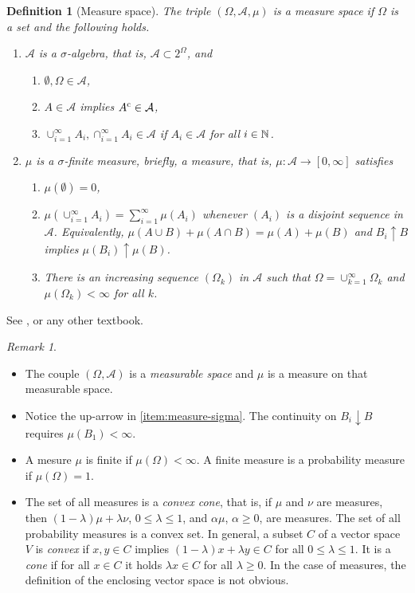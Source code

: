 \documentclass[12pt,a4paper]{amsart}
\theoremstyle{plain}
\newtheorem{definition}[theorem]{Definition}%
\theoremstyle{definition}
\theoremstyle{remark}
\newtheorem{remark}[theorem]{Remark}
\begin{document}
\begin{definition}[Measure space]
The triple $(\Omega,\mathcal A,\mu)$ is a \emph{measure space} if
$\Omega$ is a set and the following holds.
\begin{enumerate}
\item $\mathcal A$ is a \emph{$\sigma$-algebra}, that is, $\mathcal A
  \subset 2^\Omega$, and
  \begin{enumerate}
  \item $\emptyset, \Omega \in \mathcal A$,
  \item $A \in \mathcal A$ implies $A^{\text c} \in \mathcal A$,
  \item
    $\cup_{i=1}^{\infty} A_i, \cap_{i=1}^{\infty} A_i \in \mathcal A$
    if $A_i \in \mathcal A$ for all $i \in \mathbb{N}$.
  \end{enumerate}
  \item $\mu$ is a \emph{$\sigma$-finite measure}, briefly, a
    \emph{measure}, that is, $\mu \colon \mathcal A \to [0,\infty]$ satisfies
  \begin{enumerate} 
  \item $\mu(\emptyset) = 0$,
  \item \label{item:measure-sigma}
    $\mu\left(\cup_{i=1 }^\infty A_i\right) = \sum_{i=1}^\infty
    \mu(A_i)$ whenever $(A_i)$ is a disjoint sequence in $\mathcal
    A$. Equivalently,
    $\mu(A \cup B) + \mu(A \cap B) = \mu(A) + \mu(B)$ and
    $B_i \uparrow B$ implies $\mu(B_i) \uparrow \mu(B)$.
  \item There is an increasing sequence $(\Omega_k)$ in $\mathcal A$
    such that $\Omega = \cup_{k=1}^\infty \Omega_k$ and
    $\mu(\Omega_k) < \infty$ for all $k$.
  \end{enumerate}
\end{enumerate}
\end{definition}
See \cite[Cap. 1]{rudin:1987-3rd}, or any other textbook.
\begin{remark}\ 
\begin{itemize}
\item The couple $(\Omega,\mathcal A)$ is a \emph{measurable space} and
$\mu$ is a measure on that measurable space. 
\item  Notice the up-arrow in
\cref{item:measure-sigma}. The continuity on $B_i \downarrow B$
requires $\mu(B_1) < \infty$. 
\item  A mesure $\mu$ is finite if
$\mu(\Omega) < \infty$. A finite measure is a probability measure if
$\mu(\Omega) =1$.
\item The set of all measures is a \emph{convex cone}, that is, if
  $\mu$ and $\nu$ are measures, then $(1-\lambda)\mu+\lambda \nu$,
  $0 \leq \lambda \leq 1$, and $\alpha \mu$, $\alpha \geq 0$, are
  measures. The set of all probability measures is a convex set. In
  general, a subset $C$ of a vector space $V$ is \emph{convex} if
  $x,y \in C$ implies $(1-\lambda)x + \lambda y \in C$ for all
  $0 \leq \lambda \leq 1$. It is a \emph{cone} if for all $x \in C$ it
  holds $\lambda x \in C$ for all $\lambda \geq 0$. In the case of
  measures, the definition of the enclosing vector space is not
  obvious.
\end{itemize}
\end{remark}
\end{document}
